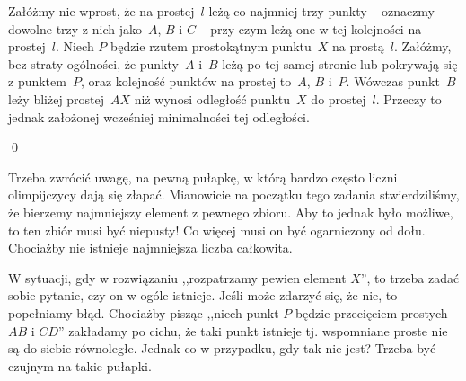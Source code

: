 \begin{center}
\end{center}

\vspace{10px}
\noindent
Załóżmy nie wprost, że na prostej~$l$ leżą co najmniej trzy punkty -- oznaczmy dowolne trzy z nich jako~$A$, $B$ i $C$ -- przy czym leżą one w tej kolejności na prostej~$l$. Niech $P$ będzie rzutem prostokątnym punktu~$X$ na prostą~$l$. Załóżmy, bez straty ogólności, że punkty~$A$ i~$B$ leżą po tej samej stronie lub pokrywają się z punktem~$P$, oraz kolejność punktów na prostej to~$A$, $B$ i~$P$. Wówczas punkt~$B$ leży bliżej prostej~$AX$ niż wynosi odległość punktu~$X$ do prostej~$l$. Przeczy to jednak założonej wcześniej minimalności tej odległości.

\qed

\noindent
Trzeba zwrócić uwagę, na pewną pułapkę, w którą bardzo często liczni olimpijczycy dają się złapać. Mianowicie na początku tego zadania stwierdziliśmy, że bierzemy najmniejszy element z pewnego zbioru. Aby to jednak było możliwe, to ten zbiór musi być niepusty! Co więcej musi on być ogarniczony od dołu. Chociażby nie istnieje najmniejsza liczba całkowita.

\vspace{10px}
\noindent
W sytuacji, gdy w rozwiązaniu ,,rozpatrzamy pewien element $X$'', to trzeba zadać sobie pytanie, czy on w ogóle istnieje. Jeśli może zdarzyć się, że nie, to popełniamy błąd. Chociażby pisząc ,,niech punkt $P$ będzie przecięciem prostych $AB$ i $CD$'' zakładamy po cichu, że taki punkt istnieje tj. wspomniane proste nie są do siebie równoległe. Jednak co w przypadku, gdy tak nie jest? Trzeba być czujnym na takie pułapki.
\vspace{10px}
